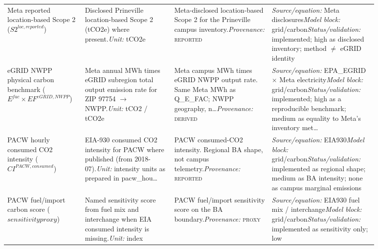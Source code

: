 \documentclass[11pt]{article}
\newcommand{\Reported}{\textsc{reported}}
\newcommand{\Derived}{\textsc{derived}}
\newcommand{\Proxy}{\textsc{proxy}}
\begin{document}
\begin{longtable}{@{}p{0.16\linewidth}p{0.22\linewidth}p{0.24\linewidth}p{0.26\linewidth}@{}}
Meta reported location-based Scope 2 ($S2^{loc,reported}$) & Disclosed Prineville location-based Scope 2 (tCO2e) where present.\newline \textit{Unit:} tCO2e & Meta-disclosed location-based Scope 2 for the Prineville campus inventory.\newline \textit{Provenance:} \Reported{} & \textit{Source/equation:} Meta disclosures\newline \textit{Model block:} grid/carbon\newline \textit{Status/validation:} implemented; high as disclosed inventory; method $\neq$ eGRID identity\\
eGRID NWPP physical carbon benchmark ($E^{fac} \times EF^{eGRID,NWPP}$) & Meta annual MWh times eGRID subregion total output emission rate for ZIP 97754 $\to$ NWPP.\newline \textit{Unit:} tCO2 / tCO2e & Meta campus MWh times eGRID NWPP output rate. Same Meta MWh as Q\_E\_FAC; NWPP geography, n\ldots\newline \textit{Provenance:} \Derived{} & \textit{Source/equation:} EPA\_EGRID $\times$ Meta electricity\newline \textit{Model block:} grid/carbon\newline \textit{Status/validation:} implemented; high as a reproducible benchmark; medium as equality to Meta's inventory met\ldots\\
PACW hourly consumed CO2 intensity ($CI^{PACW,consumed}$) & EIA-930 consumed CO2 intensity for PACW where published (from 2018-07).\newline \textit{Unit:} intensity units as prepared in pacw\_hou\ldots & PACW consumed-CO2 intensity. Regional BA shape, not campus telemetry.\newline \textit{Provenance:} \Reported{} & \textit{Source/equation:} EIA930\newline \textit{Model block:} grid/carbon\newline \textit{Status/validation:} implemented as regional shape; medium as BA intensity; none as campus marginal emissions\\
PACW fuel/import carbon score ($sensitivity proxy$) & Named sensitivity score from fuel mix and interchange when EIA consumed intensity is missing.\newline \textit{Unit:} index & PACW fuel/import sensitivity score on the BA boundary.\newline \textit{Provenance:} \Proxy{} & \textit{Source/equation:} EIA930 fuel mix / interchange\newline \textit{Model block:} grid/carbon\newline \textit{Status/validation:} implemented as sensitivity only; low\\

\end{longtable}
\end{document}
